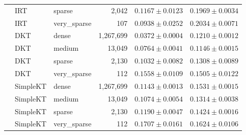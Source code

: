 \begin{table}[t]
{\begin{tabular}{lllrcc}
 & IRT & sparse & 2,042 & $0.1167 \pm 0.0123$ & $0.1969 \pm 0.0034$ \\
 & IRT & very\_sparse & 107 & $0.0938 \pm 0.0252$ & $0.2034 \pm 0.0071$ \\
 & DKT & dense & 1,267,699 & $0.0372 \pm 0.0004$ & $0.1210 \pm 0.0012$ \\
 & DKT & medium & 13,049 & $0.0764 \pm 0.0041$ & $0.1146 \pm 0.0015$ \\
 & DKT & sparse & 2,130 & $0.1032 \pm 0.0082$ & $0.1308 \pm 0.0089$ \\
 & DKT & very\_sparse & 112 & $0.1558 \pm 0.0109$ & $0.1505 \pm 0.0122$ \\
 & SimpleKT & dense & 1,267,699 & $0.1143 \pm 0.0013$ & $0.1531 \pm 0.0015$ \\
 & SimpleKT & medium & 13,049 & $0.1074 \pm 0.0054$ & $0.1314 \pm 0.0038$ \\
 & SimpleKT & sparse & 2,130 & $0.1190 \pm 0.0047$ & $0.1424 \pm 0.0016$ \\
 & SimpleKT & very\_sparse & 112 & $0.1707 \pm 0.0161$ & $0.1624 \pm 0.0106$ \\
\bottomrule
\end{tabular}
}
\end{table}
